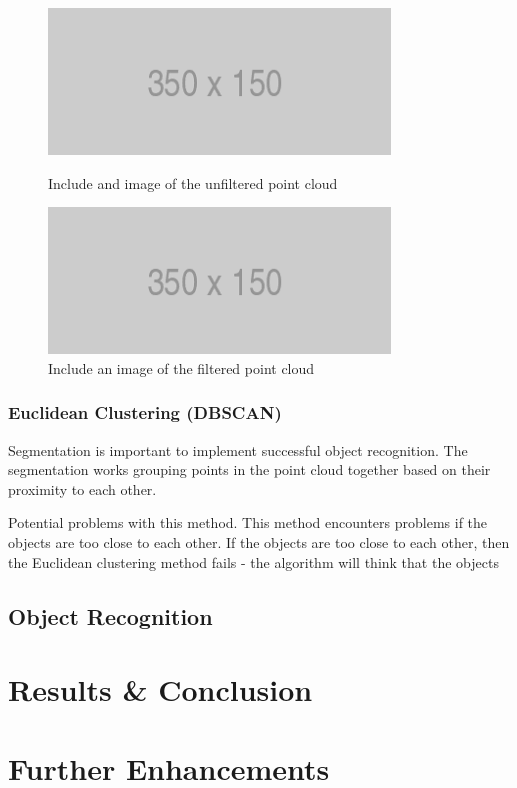\documentclass[a4paper]{article}
\begin{document}
\begin{figure}[h]
\begin{minipage}{0.45\linewidth}
\centering
\includegraphics[scale=0.5]{placeholder}
\caption{Include and image of the unfiltered point cloud}
\end{minipage}
\hspace{0.5cm}
\begin{minipage}{0.45\linewidth}
\centering
\includegraphics[scale=0.5]{placeholder}
\caption{Include an image of the filtered point cloud}
\end{minipage}
\end{figure}

\subsubsection{Euclidean Clustering (DBSCAN)}
Segmentation is important to implement successful object recognition. The segmentation works grouping points in the point cloud together based on their proximity to each other.

Potential problems with this method. This method encounters problems if the objects are too close to each other. If the objects are too close to each other, then the Euclidean clustering method fails - the algorithm will think that the objects 

\subsection{Object Recognition}


\section{Results \& Conclusion}


\section{Further Enhancements}
\end{document}
